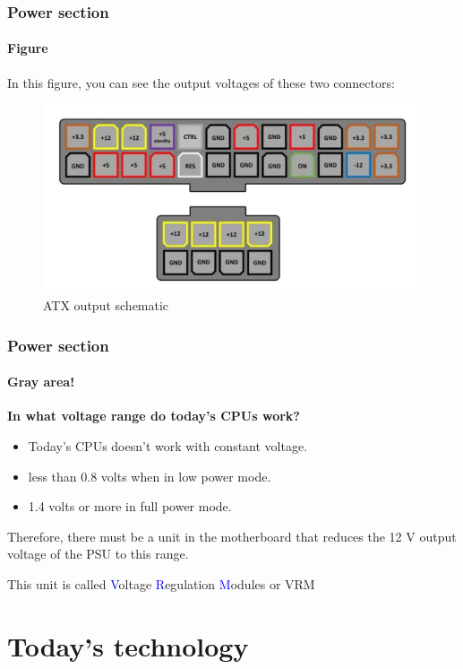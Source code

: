 \documentclass[
	12pt, %
]{beamer}
\begin{document}
\begin{frame}
	\frametitle{Power section}
	\framesubtitle{Figure}
	In this figure, you can see the output voltages of these two connectors:
	
	\begin{figure}
		\centering
		\includegraphics[width=0.8\linewidth]{Images/img12.jpg}
		\caption{ATX output schematic}
		\label{ATX output schematic}
	\end{figure}
\end{frame}





\begin{frame}
	\frametitle{Power section}
	\framesubtitle{Gray area!}
	\textbf{In what voltage range do today's CPUs work?}
	\begin{itemize}
		\item Today's CPUs doesn't work with constant voltage.
		\item less than 0.8 volts when in low power mode.
		\item 1.4 volts or more in full power mode.
	\end{itemize}
	
	\bigskip
	
	Therefore, there must be a unit in the motherboard that reduces the 12 V output voltage of the PSU to this range.
	
	\bigskip
	
	\alert{This unit is called \textcolor{blue}{V}oltage \textcolor{blue}{R}egulation \textcolor{blue}{M}odules or VRM}
	
\end{frame}




\section{Today's technology}
\end{document}
